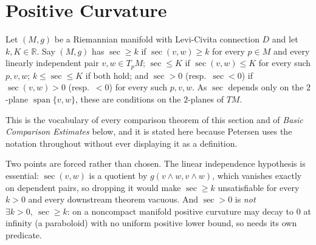 \section{Positive Curvature}

\begin{definition}
  \label{def:pet-ch6-sec-bounds}
  \leanok
  Let $(M,g)$ be a Riemannian manifold with Levi-Civita connection $D$ and let
  $k,K\in\mathbb{R}$. Say $(M,g)$ has $\sec\ge k$ if $\sec(v,w)\ge k$ for every
  $p\in M$ and every linearly independent pair $v,w\in T_pM$; $\sec\le K$ if
  $\sec(v,w)\le K$ for every such $p,v,w$; $k\le\sec\le K$ if both hold; and
  $\sec>0$ (resp.\ $\sec<0$) if $\sec(v,w)>0$ (resp.\ $<0$) for every such
  $p,v,w$. As $\sec$ depends only on the $2$-plane $\operatorname{span}\{v,w\}$,
  these are conditions on the $2$-planes of $TM$.

  This is the vocabulary of every comparison theorem of this section and of
  \emph{Basic Comparison Estimates} below, and it is stated here because
  Petersen uses the notation throughout without ever displaying it as a
  definition.

  Two points are forced rather than chosen. The linear independence hypothesis
  is essential: $\sec(v,w)$ is a quotient by $g(v\wedge w,v\wedge w)$, which
  vanishes exactly on dependent pairs, so dropping it would make $\sec\ge k$
  unsatisfiable for every $k>0$ and every downstream theorem vacuous. And
  $\sec>0$ is \emph{not} $\exists k>0,\ \sec\ge k$: on a noncompact manifold
  positive curvature may decay to $0$ at infinity (a paraboloid) with no uniform
  positive lower bound, so  needs its own
  predicate.
\end{definition}


